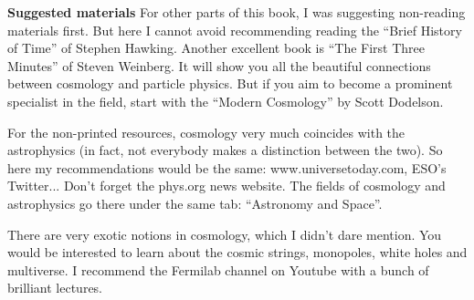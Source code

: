 
\thispagestyle{fancy}
\fancyhf{}
\renewcommand{\headrulewidth}{0pt}
\fancyfoot{}
{\huge{\textbf{Suggested materials}}}
\vskip12pt
For other parts of this book, I was suggesting non-reading materials first. But here I cannot avoid recommending reading the ``Brief History of Time'' of Stephen Hawking.  Another excellent book is ``The First Three Minutes'' of Steven Weinberg. It will show you all the beautiful connections between cosmology and particle physics. But if you aim to become a prominent specialist in the field, start with the ``Modern Cosmology'' by Scott Dodelson.

For the non-printed resources, cosmology very much coincides with the astrophysics (in fact, not everybody makes a distinction between the two). So here my recommendations would be the same: www.universetoday.com, ESO's Twitter... Don't forget the phys.org news website. The fields of cosmology and astrophysics go there under the same tab: ``Astronomy and Space''.

There are very exotic notions in cosmology, which I didn't dare mention. You would be interested to learn about the cosmic strings, monopoles, white holes and multiverse. I recommend the Fermilab channel on Youtube with a bunch of brilliant lectures.
\newpage


